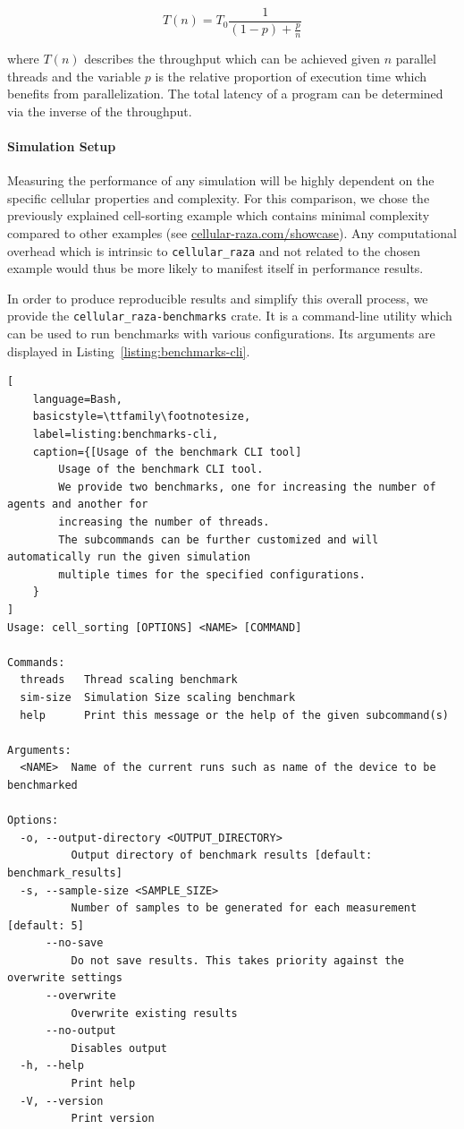 \begin{equation}
    T(n) = T_0\frac{1}{(1-p) + \frac{p}{n}}
    \label{eq:amdahls-law}
\end{equation}

where $T(n)$ describes the throughput which can be achieved given $n$ parallel threads and the
variable $p$ is the relative proportion of execution time which benefits from parallelization.
The total latency of a program can be determined via the inverse of the throughput.

\paragraph{Simulation Setup}
Measuring the performance of any simulation will be highly dependent on the specific cellular
properties and complexity.
For this comparison, we chose the previously explained cell-sorting example which contains minimal
complexity compared to other examples (see
\href{https://cellular-raza.com/showcase}{cellular-raza.com/showcase}).
Any computational overhead which is intrinsic to \texttt{cellular\_raza} and not related to the
chosen example would thus be more likely to manifest itself in performance results.

In order to produce reproducible results and simplify this overall process, we provide the
\texttt{cellular\_raza-benchmarks} crate.
It is a command-line utility which can be used to run benchmarks with various configurations.
Its arguments are displayed in Listing~\ref{listing:benchmarks-cli}.

\begin{minipage}{\linewidth}\begin{lstlisting}[
    language=Bash,
    basicstyle=\ttfamily\footnotesize,
    label=listing:benchmarks-cli,
    caption={[Usage of the benchmark CLI tool]
        Usage of the benchmark CLI tool.
        We provide two benchmarks, one for increasing the number of agents and another for
        increasing the number of threads.
        The subcommands can be further customized and will automatically run the given simulation
        multiple times for the specified configurations.
    }
]
Usage: cell_sorting [OPTIONS] <NAME> [COMMAND]

Commands:
  threads   Thread scaling benchmark
  sim-size  Simulation Size scaling benchmark
  help      Print this message or the help of the given subcommand(s)

Arguments:
  <NAME>  Name of the current runs such as name of the device to be benchmarked

Options:
  -o, --output-directory <OUTPUT_DIRECTORY>
          Output directory of benchmark results [default: benchmark_results]
  -s, --sample-size <SAMPLE_SIZE>
          Number of samples to be generated for each measurement [default: 5]
      --no-save
          Do not save results. This takes priority against the overwrite settings
      --overwrite
          Overwrite existing results
      --no-output
          Disables output
  -h, --help
          Print help
  -V, --version
          Print version
\end{lstlisting}\end{minipage}


